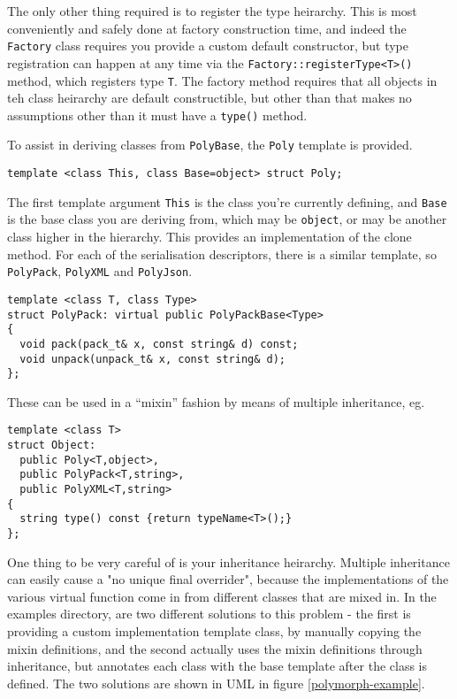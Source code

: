 The only other thing required is to register the type heirarchy. This
is most conveniently and safely done at factory construction time, and indeed the
\verb+Factory+ class requires you provide a custom default
constructor, but type registration can happen at any time via the
\verb+Factory::registerType<T>()+ method, which registers type
\verb+T+. The factory method requires that all objects in teh class
heirarchy are default constructible, but other than that makes no
assumptions other than it must have a \verb+type()+ method.

To assist in deriving classes from \verb+PolyBase+, the \verb+Poly+ template
is provided.
\begin{verbatim}
template <class This, class Base=object> struct Poly;
\end{verbatim}
The first template argument \verb+This+ is the class you're currently defining,
and \verb+Base+ is the base class you are deriving from, which may be
\verb+object+, or may be another class higher in the
hierarchy. This provides an implementation of the clone method. For
each of the serialisation descriptors, there is a similar template, so
\verb+PolyPack+, \verb+PolyXML+ and
\verb+PolyJson+. 
\begin{verbatim}
template <class T, class Type>
struct PolyPack: virtual public PolyPackBase<Type>
{
  void pack(pack_t& x, const string& d) const;
  void unpack(unpack_t& x, const string& d);
};
\end{verbatim}
These can be used in a ``mixin'' fashion by means of multiple
inheritance, eg.

\begin{verbatim}
template <class T>
struct Object: 
  public Poly<T,object>, 
  public PolyPack<T,string>, 
  public PolyXML<T,string> 
{
  string type() const {return typeName<T>();}
};
\end{verbatim}

One thing to be very careful of is your inheritance
heirarchy. Multiple inheritance can easily cause a "no unique final
overrider", because the implementations of the various virtual
function come in from different classes that are mixed in. In the
examples directory, are two different solutions to this problem - the
first is providing a custom implementation template class, by manually
copying the mixin definitions, and the second actually uses the mixin
definitions through inheritance, but annotates each class with the
base template after the class is defined. The two solutions are shown
in UML in figure \ref{polymorph-example}.

